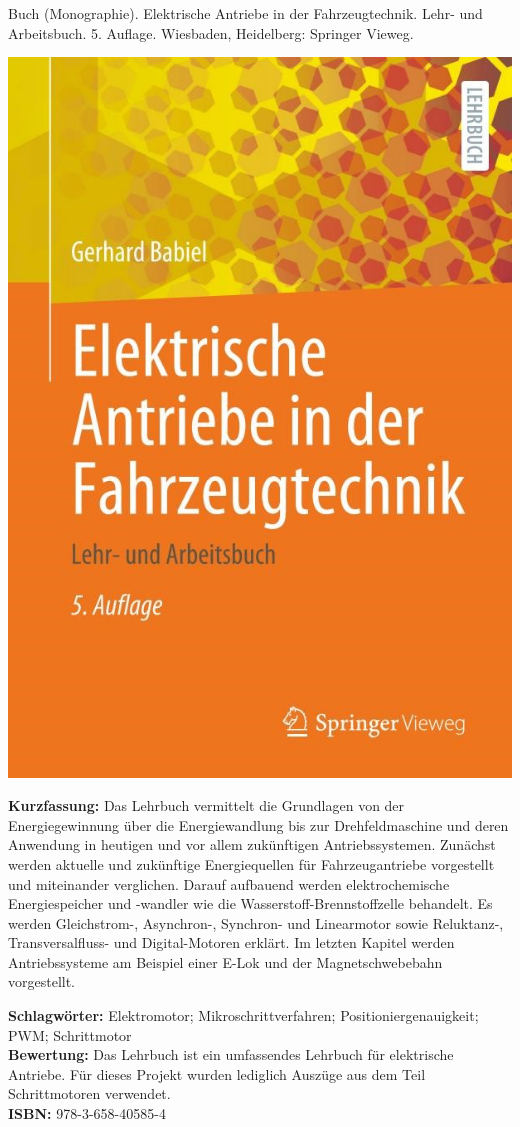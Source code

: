 {
Buch (Monographie). Elektrische Antriebe in der Fahrzeugtechnik. Lehr- und Arbeitsbuch.
5. Auflage. Wiesbaden, Heidelberg: Springer Vieweg.	
\begin{minipage}{0.38\textwidth}
	\includegraphics[width=\linewidth]{images/Babiel.jpg}
\end{minipage}
\hfill
\begin{minipage}{0.6\textwidth}
\textbf{Kurzfassung:}
Das Lehrbuch vermittelt die Grundlagen von der Energiegewinnung über die Energiewandlung bis zur Drehfeldmaschine und deren Anwendung in heutigen und vor allem zukünftigen Antriebssystemen. Zunächst werden aktuelle und zukünftige Energiequellen für Fahrzeugantriebe vorgestellt und miteinander verglichen. Darauf aufbauend werden elektrochemische Energiespeicher und -wandler wie die Wasserstoff-Brennstoffzelle behandelt. Es werden Gleichstrom-, Asynchron-, Synchron- und Linearmotor sowie Reluktanz-, Transversalfluss- und Digital-Motoren erklärt. Im letzten Kapitel werden Antriebssysteme am Beispiel einer E-Lok und der Magnetschwebebahn vorgestellt.
\end{minipage}
\textbf{Schlagwörter:}
Elektromotor; Mikroschrittverfahren; Positioniergenauigkeit; PWM; Schrittmotor
\\ \textbf{Bewertung:}
Das Lehrbuch ist ein umfassendes Lehrbuch für elektrische Antriebe. Für dieses Projekt wurden lediglich Auszüge aus dem Teil \glqq Schrittmotoren \grqq verwendet.
\\ \textbf{ISBN:}
978-3-658-40585-4
}


